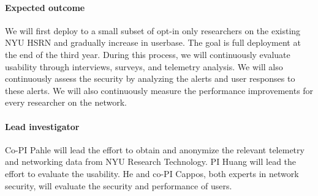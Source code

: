 \paragraph{Expected outcome} We will first deploy to a small subset of opt-in only researchers on the existing NYU HSRN and gradually increase in userbase. The goal is full deployment at the end of the third year. During this process, we will continuously evaluate usability through interviews, surveys, and telemetry analysis. We will also continuously assess the security by analyzing the alerts and user responses to these alerts. We will also continuously measure the performance improvements for every researcher on the network.

\paragraph{Lead investigator} Co-PI Pahle will lead the effort to obtain and anonymize the relevant telemetry and networking data from NYU Research Technology. PI Huang will lead the effort to evaluate the usability. He and co-PI Cappos, both experts in network security, will evaluate the security and performance of users.

